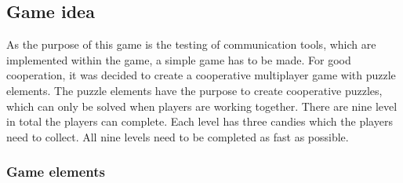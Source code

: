 \subsection{Game idea}
\label{section:Game idea}
As the purpose of this game is the testing of communication tools, which are implemented within the game, a simple game has to be made.
For good cooperation, it was decided to create a cooperative multiplayer game with puzzle elements. The puzzle elements have the purpose to create cooperative puzzles, which can only be solved when players are working together. There are nine level in total the players can complete. Each level has three candies which the players need to collect. All nine levels need to be completed as fast as possible.

\subsubsection{Game elements}
\label{section:Game elements}

